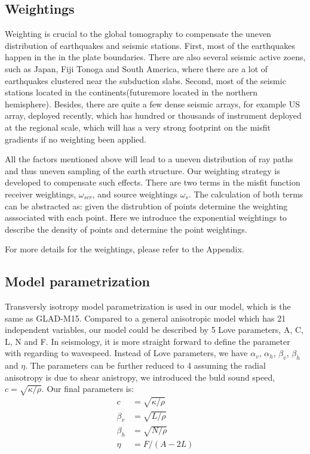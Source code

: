 \documentclass[extra,mreferee]{gji}
\begin{document}
\subsection{Weightings}
Weighting is crucial to the global tomography to compensate the uneven distribution
of earthquakes and seismic stations. First, most of the earthquakes happen in the
in the plate boundaries. There are also several seismic active zoens, such as Japan,
Fiji Tonoga and South America, where there are a lot of earthquakes clustered near
the subduction slabs.
Second, most of the seismic stations located in the continents(futuremore located in
the northern hemisphere). Besides, there are quite a few dense seismic arrays,
for example US array, deployed recently, which has hundred or thousands of instrument deployed
at the regional scale, which will has a very strong footprint on the misfit gradients if no weighting
been applied.

All the factors mentioned above will lead to a uneven distribution of
ray paths and thus uneven sampling of the earth structure. Our weighting strategy
is developed to compensate such effects. There are two terms in the misfit function
receiver weightings, $\omega_{scr}$, and source weightings $\omega_{s}$.
The calculation of both terms can be abstracted as: given the distrubtion of
points determine the weighting asssociated with each point.
Here we introduce the exponential weightings to describe the density of points and
determine the point weightings.

For more details for the weightings, please refer to the Appendix.

\subsection{Model parametrization}

Transversly isotropy model parametrization is used in our model, which is the same as GLAD-M15. Compared to a general anisotropic model which has 21 independent variables, our model could be described by 5 Love parameters,  A, C, L, N and F. In seismology, it is more straight forward to define the parameter with regarding to wavespeed. Instead of Love parameters, we have $\alpha_v$, $\alpha_h$, $\beta_v$, $\beta_h$ and $\eta$. The parameters can be further reduced to 4 assuming the radial anisotropy is due to shear anistropy, we introduced the buld sound speed, $c=\sqrt{\kappa/\rho}$. Our final parameters is:\\
\begin{align*}
c &= \sqrt{\kappa/\rho} \\
\beta_v &= \sqrt{L/\rho} \\
\beta_h &= \sqrt{N/\rho} \\
\eta & = F/(A-2L)
\end{align*}
\end{document}
